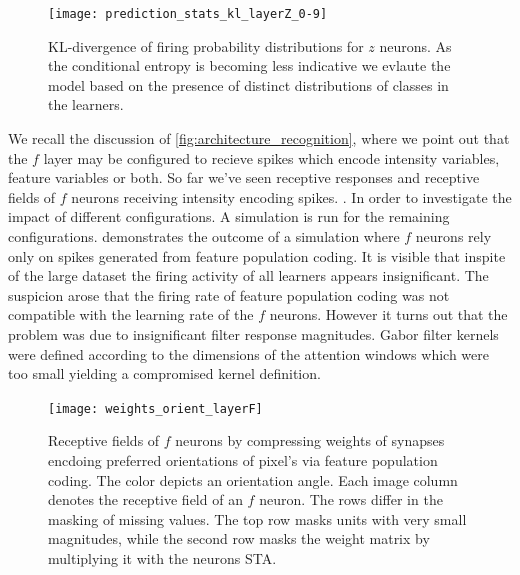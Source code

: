 \documentclass{report}
\begin{document}
\begin{figure}[ht]
\centering
\texttt{[image: prediction\_stats\_kl\_layerZ\_0-9]}
\caption{KL-divergence of firing probability distributions for $z$ neurons. As the conditional entropy is becoming less indicative we evlaute the model based on the presence of distinct distributions of classes in the learners.
\label{fig:prediction_stats_kl_layerZ_0-9}}
\end{figure}

We recall the discussion of \cref{fig:architecture_recognition}, where we point out that the $f$ layer may be configured to recieve spikes which encode intensity variables, feature variables or both. So far we've seen receptive responses and receptive fields of $f$ neurons receiving intensity encoding spikes. . In order to investigate the impact of different configurations. A simulation is run for the remaining configurations.  demonstrates the outcome of a simulation where $f$ neurons rely only on spikes generated from feature population coding. It is visible that inspite of the large dataset the firing activity of all learners appears insignificant. The suspicion arose that the firing rate of feature population coding was not compatible with the learning rate of the $f$ neurons. However it turns out that the problem was due to insignificant filter response magnitudes. Gabor filter kernels were defined according to the dimensions of the attention windows which were too small yielding a compromised kernel definition.

\begin{figure}[ht]
\centering
\texttt{[image: weights\_orient\_layerF]}
\caption{Receptive fields of $f$ neurons by compressing weights of synapses encdoing preferred orientations of pixel's via feature population coding. The color depicts an orientation angle. Each image column denotes the receptive field of an $f$ neuron. The rows differ in the masking of missing values. The top row masks units with very small magnitudes, while the second row masks the weight matrix by multiplying it with the neurons STA.
\label{fig:weights_orient_layerF}}
\end{figure}
\end{document}
